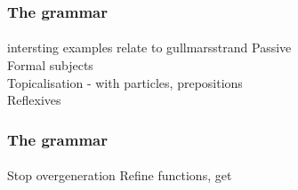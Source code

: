\documentclass[10pt]{beamer}
\renewcommand{\baselinestretch}{1.5}
\begin{document}
\begin{frame}
\frametitle{The grammar}
\framesubtitle{} 
intersting examples
relate to gullmarsstrand
Passive\\
Formal subjects\\
Topicalisation - with particles, prepositions\\
Reflexives
\end{frame}


\begin{frame}
\frametitle{The grammar}
\framesubtitle{} 
Stop overgeneration
Refine functions, get 
\end{frame}


\end{document}
